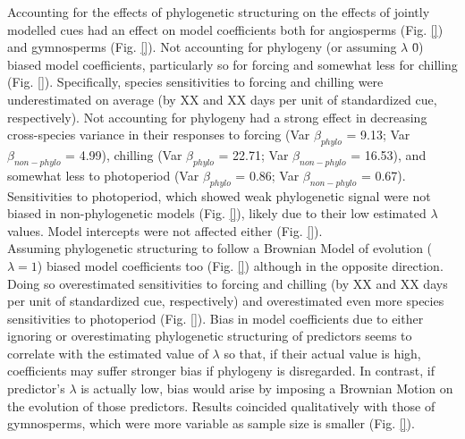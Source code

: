 \documentclass{article}\usepackage[]{graphicx}\usepackage[]{color}
\begin{document}
Accounting for the effects of phylogenetic structuring on the effects of jointly modelled cues had an effect on model coefficients both for angiosperms (Fig. \ref{}) and gymnosperms (Fig. \ref{}). Not accounting for phylogeny (or assuming $\lambda$ \= 0) biased model coefficients, particularly so for forcing and somewhat less for chilling (Fig. \ref{}). Specifically, species sensitivities to forcing and chilling were underestimated on average (by XX and XX days per unit of standardized cue, respectively). Not accounting for phylogeny had a strong effect in decreasing cross-species variance in their responses to forcing (Var $\beta_{phylo}$ = 9.13; Var $\beta_{non-phylo}$ = 4.99), chilling (Var $\beta_{phylo}$ = 22.71; Var $\beta_{non-phylo}$ = 16.53), and somewhat less to photoperiod (Var $\beta_{phylo}$ = 0.86; Var $\beta_{non-phylo}$ = 0.67). Sensitivities to photoperiod, which showed weak phylogenetic signal were not biased in non-phylogenetic models (Fig. \ref{}), likely due to their low estimated $\lambda$ values. Model intercepts were not affected either (Fig. \ref{}).\\ 

Assuming phylogenetic structuring to follow a Brownian Model of evolution ($\lambda = 1$) biased model coefficients too (Fig. \ref{}) although in the opposite direction. Doing so overestimated sensitivities to forcing and chilling (by XX and XX days per unit of standardized cue, respectively) and overestimated even more species sensitivities to photoperiod (Fig. \ref{}). Bias in model coefficients due to either ignoring or overestimating phylogenetic structuring of predictors seems to correlate with the estimated value of $\lambda$ so that, if their actual value is high, coefficients may suffer stronger bias if phylogeny is disregarded. In contrast, if predictor's $\lambda$ is actually low, bias would arise by imposing a Brownian Motion on the evolution of those predictors. Results coincided qualitatively with those of gymnosperms, which were more variable as sample size is smaller (Fig. \ref{}).\\
\end{document}
